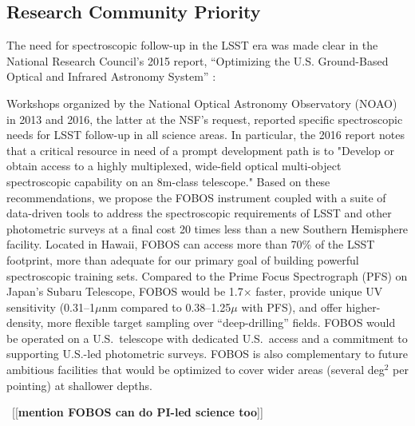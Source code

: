 \documentclass[oneside,11pt]{amsart}
\newcommand{\comment}[2][todo]{{\color{#1}[[{\bf #2}]]}}
\begin{document}
\subsection{Research Community Priority} 
\label{sec:community}

The need for spectroscopic follow-up in the LSST era was made clear in
the National Research Council's 2015 report, ``Optimizing the U.S.
Ground-Based Optical and Infrared Astronomy System'' \citep{NAP21722}:
%
\noindent{}

Workshops organized by the National Optical Astronomy Observatory (NOAO)
in 2013 and 2016, the latter at the NSF's request, reported specific
spectroscopic needs for LSST follow-up in all science areas.  In
particular, the 2016 report notes that a critical resource in need of a
prompt development path is to "Develop or obtain access to a highly
multiplexed, wide-field optical multi-object spectroscopic capability on
an 8m-class telescope."  Based on these recommendations, we propose the
FOBOS instrument coupled with a suite of data-driven tools to address
the spectroscopic requirements of LSST and other photometric surveys at
a final cost 20 times less than a new Southern Hemisphere facility.
Located in Hawaii, FOBOS can access more than 70\% of the LSST
footprint, more than adequate for our primary goal of building powerful
spectroscopic training sets.  Compared to the Prime Focus Spectrograph
(PFS) on Japan's Subaru Telescope, FOBOS would be 1.7$\times$ faster,
provide unique UV sensitivity (0.31--1$\mu$nm compared to
0.38--1.25$\mu$ with PFS), and offer higher-density, more flexible
target sampling over ``deep-drilling'' fields.  FOBOS would be operated
on a U.S.\ telescope with dedicated U.S.\ access and a commitment to
supporting U.S.-led photometric surveys.  FOBOS is also complementary to
future ambitious facilities that would be optimized to cover wider areas
(several deg$^2$ per pointing) at shallower depths.

~\comment{mention FOBOS can do PI-led science too}
\end{document}
